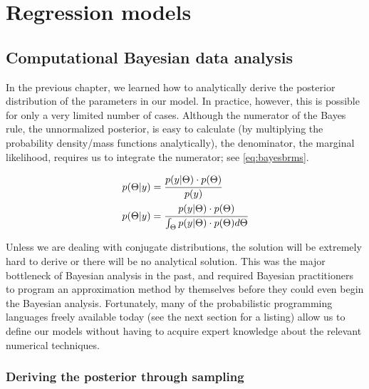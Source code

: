 \documentclass[12pt,]{krantz}
\theoremstyle{definition}
\theoremstyle{definition}
\theoremstyle{definition}
\theoremstyle{remark}
\begin{document}
\hypertarget{part-regression-models}{%
\part{Regression models}\label{part-regression-models}}

\hypertarget{ch:compbda}{%
\chapter{Computational Bayesian data analysis}\label{ch:compbda}}

In the previous chapter, we learned how to analytically derive the posterior distribution of the parameters in our model.
In practice, however, this is possible for only a very limited number of cases. Although the numerator of the Bayes rule, the unnormalized posterior, is easy to calculate (by multiplying the probability density/mass functions analytically), the denominator, the marginal likelihood, requires us to integrate the numerator; see \eqref{eq:bayesbrms}.

\begin{equation}
\begin{aligned}
p(\Theta|y) &= \cfrac{ p(y|\Theta) \cdot p(\Theta) }{p(y)}\\
p(\Theta|y) &= \cfrac{ p(y|\Theta) \cdot p(\Theta) }{\int_{\Theta} p(y|\Theta) \cdot p(\Theta) d\Theta }
\end{aligned}
\label{eq:bayesbrms}
\end{equation}

Unless we are dealing with conjugate distributions, the solution will be extremely hard to derive or there will be no analytical solution. This was the major bottleneck of Bayesian analysis in the past, and required Bayesian practitioners to program an approximation method by themselves before they could even begin the Bayesian analysis. Fortunately, many of the probabilistic programming languages freely available today (see the next section for a listing) allow us to define our models without having to acquire expert knowledge about the relevant numerical techniques.

\hypertarget{sec:sampling}{%
\section{Deriving the posterior through sampling}\label{sec:sampling}}
\end{document}
